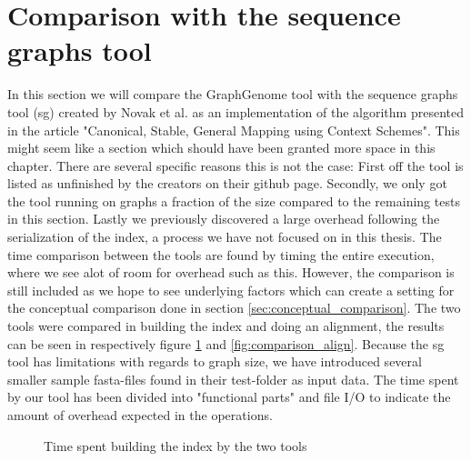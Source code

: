 \documentclass[thesis.tex]{subfiles}
\begin{document}
\section{Comparison with the sequence graphs tool}
In this section we will compare the GraphGenome tool with the sequence graphs tool (sg) created by Novak et al. as an implementation of the algorithm presented in the article "Canonical, Stable, General Mapping using Context Schemes". This might seem like a section which should have been granted more space in this chapter. There are several specific reasons this is not the case: First off the tool is listed as unfinished by the creators on their github page. Secondly, we only got the tool running on graphs a fraction of the size compared to the remaining tests in this section. Lastly we previously discovered a large overhead following the serialization of the index, a process we have not focused on in this thesis. The time comparison between the tools are found by timing the entire execution, where we see alot of room for overhead such as this. However, the comparison is still included as we hope to see underlying factors which can create a setting for the conceptual comparison done in section \ref{sec:conceptual_comparison}. The two tools were compared in building the index and doing an alignment, the results can be seen in respectively figure \ref{fig:comparison_build} and \ref{fig:comparison_align}. Because the sg tool has limitations with regards to graph size, we have introduced several smaller sample fasta-files found in their test-folder as input data. The time spent by our tool has been divided into "functional parts" and file I/O to indicate the amount of overhead expected in the operations.
\label{sec:comparison_tools}
\begin{figure}[!hb]
  \caption{Time spent building the index by the two tools}
  \label{fig:comparison_build}
\end{figure}
\end{document}

